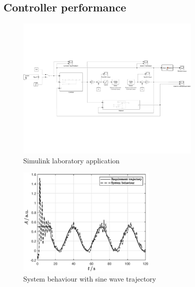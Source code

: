 \newpage

\subsection{Controller performance} \label{appendix:performance}
\FloatBarrier
\begin{figure}[ht]
	\begin{center}
		\includegraphics[clip, trim=0cm 6cm 0cm 6cm, width=0.8\textwidth]{simulink/simulinkLaboratory.pdf}
		\caption[Simulink laboratory application]{Simulink laboratory application}
		\label{fig:simuLaboratory}
	\end{center}
\end{figure}
\FloatBarrier

\FloatBarrier
\begin{figure}[ht]
    \begin{center}
    \includegraphics[angle=0,width=0.6\textwidth]{simulink/simulinkPlotTrajectoryLaboratory.eps}
    \end{center}
    \caption[System behaviour with sine wave trajectory]
    {System behaviour with sine wave trajectory}
    \label{fig:simuSineTrajectory}
\end{figure}
\FloatBarrier


